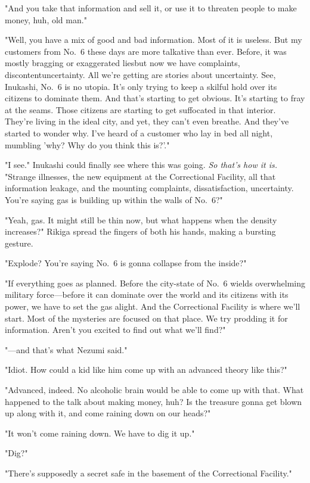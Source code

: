 "And you take that information and sell it, or use it to threaten people
to make money, huh, old man."

"Well, you have a mix of good and bad information. Most of it is
useless. But my customers from No.~6 these days are more talkative than
ever. Before, it was mostly bragging or exaggerated lies\el but now we
have complaints, discontent\el uncertainty. All we're getting are
stories about uncertainty. See, Inukashi, No.~6 is no utopia. It's only
trying to keep a skilful hold over its citizens to dominate them. And
that's starting to get obvious. It's starting to fray at the seams.
Those citizens are starting to get suffocated in that interior. They're
living in the ideal city, and yet, they can't even breathe. And they've
started to wonder why. I've heard of a customer who lay in bed all
night, mumbling 'why? Why do you think this is?'."

"I see." Inukashi could finally see where this was going. \emph{So that's how
it is.} "Strange illnesses, the new equipment at the Correctional
Facility, all that information leakage, and the mounting complaints,
dissatisfaction, uncertainty. You're saying gas is building up within
the walls of No.~6?"

"Yeah, gas. It might still be thin now, but what happens when the
density increases?" Rikiga spread the fingers of both his hands, making
a bursting gesture.

"Explode? You're saying No.~6 is gonna collapse from the inside?"

"If everything goes as planned. Before the city-state of No.~6 wields
overwhelming military force---before it can dominate over the world and
its citizens with its power, we have to set the gas alight. And the
Correctional Facility is where we'll start. Most of the mysteries are
focused on that place. We try prodding it for information. Aren't you
excited to find out what we'll find?"

"---and that's what Nezumi said."

"Idiot. How could a kid like him come up with an advanced theory like
this?"

"Advanced, indeed. No alcoholic brain would be able to come up with
that. What happened to the talk about making money, huh? Is the treasure
gonna get blown up along with it, and come raining down on our heads?"

"It won't come raining down. We have to dig it up."

"Dig?"

"There's supposedly a secret safe in the basement of the Correctional
Facility."

